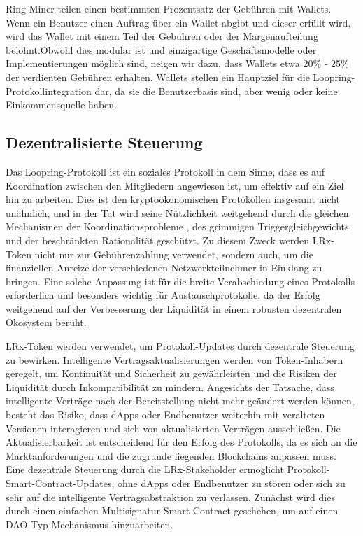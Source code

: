 \documentclass[UTF8,nofonts]{article}
\begin{document}
\begin{multicols}{2}
Ring-Miner teilen einen bestimmten Prozentsatz der Gebühren mit Wallets. Wenn ein Benutzer einen Auftrag über ein Wallet abgibt und dieser erfüllt wird, wird das Wallet mit einem Teil der Gebühren oder der Margenaufteilung belohnt.Obwohl dies modular ist und einzigartige Geschäftsmodelle oder Implementierungen möglich sind, neigen wir dazu, dass Wallets etwa 20\% - 25\% der verdienten Gebühren erhalten. Wallets stellen ein Hauptziel für die Loopring-Protokollintegration dar, da sie die Benutzerbasis sind, aber wenig oder keine Einkommensquelle haben.

\subsection{Dezentralisierte Steuerung}
Das Loopring-Protokoll ist ein soziales Protokoll in dem Sinne, dass es auf Koordination zwischen den Mitgliedern angewiesen ist, um effektiv auf ein Ziel hin zu arbeiten. Dies ist den kryptoökonomischen Protokollen insgesamt nicht unähnlich, und in der Tat wird seine Nützlichkeit weitgehend durch die gleichen Mechanismen der Koordinationsprobleme \cite{vitalikgovernance}, des grimmigen Triggergleichgewichts und der beschränkten Rationalität geschützt. Zu diesem Zweck werden LRx-Token nicht nur zur Gebührenzahlung verwendet, sondern auch, um die finanziellen Anreize der verschiedenen Netzwerkteilnehmer in Einklang zu bringen. Eine solche Anpassung ist für die breite Verabschiedung eines Protokolls erforderlich und besonders wichtig für Austauschprotokolle, da der Erfolg weitgehend auf der Verbesserung der Liquidität in einem robusten dezentralen Ökosystem beruht.

LRx-Token werden verwendet, um Protokoll-Updates durch dezentrale Steuerung zu bewirken. Intelligente Vertragsaktualisierungen werden von Token-Inhabern geregelt, um Kontinuität und Sicherheit zu gewährleisten und die Risiken der Liquidität durch Inkompatibilität zu mindern. Angesichts der Tatsache, dass intelligente Verträge nach der Bereitstellung nicht mehr geändert werden können, besteht das Risiko, dass dApps oder Endbenutzer weiterhin mit veralteten Versionen interagieren und sich von aktualisierten Verträgen ausschließen. Die Aktualisierbarkeit ist entscheidend für den Erfolg des Protokolls, da es sich an die Marktanforderungen und die zugrunde liegenden Blockchains anpassen muss. Eine dezentrale Steuerung durch die LRx-Stakeholder ermöglicht Protokoll-Smart-Contract-Updates, ohne dApps oder Endbenutzer zu stören oder sich zu sehr auf die intelligente Vertragsabstraktion zu verlassen. Zunächst wird dies durch einen einfachen Multisignatur-Smart-Contract geschehen, um auf einen DAO-Typ-Mechanismus hinzuarbeiten.


\end{multicols}
\end{document}
